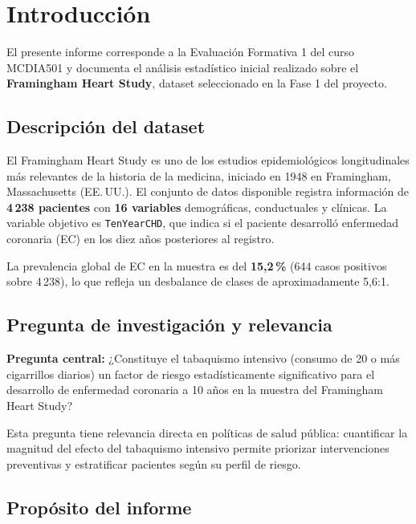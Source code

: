 \documentclass[11pt,a4paper]{article}
\begin{document}
\vspace{0.5em}
\tableofcontents
\newpage

\section{Introducción}

El presente informe corresponde a la Evaluación Formativa 1 del curso MCDIA501
y documenta el análisis estadístico inicial realizado sobre el
\textbf{Framingham Heart Study}, dataset seleccionado en la Fase 1 del proyecto.

\subsection{Descripción del dataset}

El Framingham Heart Study es uno de los estudios epidemiológicos longitudinales
más relevantes de la historia de la medicina, iniciado en 1948 en Framingham,
Massachusetts (EE.\,UU.). El conjunto de datos disponible registra información de
\textbf{4\,238 pacientes} con \textbf{16 variables} demográficas, conductuales y clínicas.
La variable objetivo es \texttt{TenYearCHD}, que indica si el paciente desarrolló
enfermedad coronaria (EC) en los diez años posteriores al registro.

La prevalencia global de EC en la muestra es del \textbf{15{,}2\,\%} (644 casos positivos
sobre 4\,238), lo que refleja un desbalance de clases de aproximadamente 5{,}6:1.

\subsection{Pregunta de investigación y relevancia}

\textbf{Pregunta central:} ¿Constituye el tabaquismo intensivo (consumo de 20 o más
cigarrillos diarios) un factor de riesgo estadísticamente significativo para el
desarrollo de enfermedad coronaria a 10 años en la muestra del Framingham Heart Study?

Esta pregunta tiene relevancia directa en políticas de salud pública: cuantificar
la magnitud del efecto del tabaquismo intensivo permite priorizar intervenciones
preventivas y estratificar pacientes según su perfil de riesgo.

\subsection{Propósito del informe}
\end{document}
